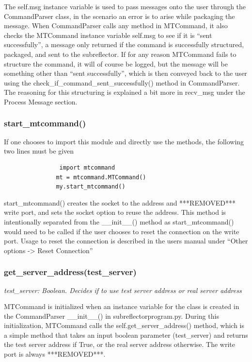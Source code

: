 \documentclass{article}
\begin{document}
\vspace{10pt}
The self.msg instance variable is used to pass messages onto the user through the CommandParser class, in the scenario an error is to arise while packaging the message. When CommandParser calls any method in MTCommand, it also checks the MTCommand instance variable self.msg to see if it is ``sent successfully'', a message only returned if the command is successfully structured, packaged, and sent to the subreflector. If for any reason MTCommand fails to structure the command, it will of course be logged, but the message will be something other than ``sent successfully'', which is then conveyed back to the user using the check\_if\_command\_sent\_successfully() method in CommandParser.  The reasoning for this structuring is explained a bit more in recv\_msg under the Process Message section.



\subsubsection*{start\_mtcommand()}
If one chooses to import this module and directly use the methods, the following two lines must be given
    \begin{lstlisting}
    		    import mtcommand
               mt = mtcommand.MTCommand()
               my.start_mtcommand()
    \end{lstlisting}

start\_mtcommand() creates the socket to the address and ***REMOVED*** write port, and sets the socket option to reuse the address. This method is intentionally separated from the \_\_init\_\_() method as  start\_mtcommand() would need to be called if the user chooses to reset the connection on the write port. Usage to reset the connection is described in the users manual under ``Other options -> Reset Connection''

\subsubsection*{get\_server\_address(test\_server)}
\emph{test\_server:  Boolean. Decides if to use test server address or real server address}
\vspace{10pt}

MTCommand is initialized when an instance variable for the class is created in the CommandParser \_\_init\_\_() in subreflector\-program.py. During this initialization, MTCommand calls the self.get\_server\_address() method, which is a simple method that takes an input boolean parameter (test\_server) and returns the test  server address if True, or the real server address otherwise. The write port is always ***REMOVED***.
\end{document}

